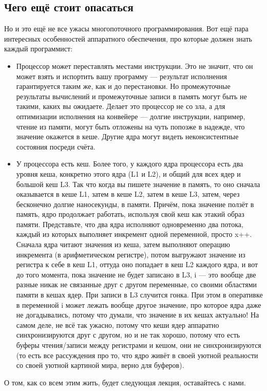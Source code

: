 \documentclass{../../text-style}
\begin{document}
\subsection{Чего ещё стоит опасаться}

Но и это ещё не все ужасы многопоточного программирования. Вот ещё пара интересных особенностей аппаратного обеспечения, про которые должен знать каждый программист:

\begin{itemize}
    \item Процессор может переставлять местами инструкции. Это не значит, что он может взять и испортить вашу программу --- результат исполнения гарантируется таким же, как и до перестановки. Но промежуточные результаты вычислений и промежуточные записи в память могут быть не такими, каких вы ожидаете. Делает это процессор не со зла, а для оптимизации исполнения на конвейере --- долгие инструкции, например, чтение из памяти, могут быть отложены на чуть попозже в надежде, что значение окажется в кеше. Другие ядра могут видеть неконсистентные состояния посреди счёта.
    \item У процессора есть кеш. Более того, у каждого ядра процессора есть два уровня кеша, конкретно этого ядра (L1 и L2), и общий для всех ядер и большой кеш L3. Так что когда вы пишете значение в память, то оно сначала оказывается в кеше L1, затем в кеше L2, затем в кеше L3, затем, через бесконечно долгие наносекунды, в памяти. Причём, пока значение ползёт в память, ядро продолжает работать, используя свой кеш как этакий образ памяти. Представьте, что два ядра исполняют одновременно два потока, каждый из которых выполняет инкремент одной переменной, просто x++. Сначала ядра читают значения из кеша, затем выполняют операцию инкремента (в арифметическом регистре), потом выгружают значение из регистра к себе в кеш L1, оттуда оно попадает в кеш L2 каждого ядра, и вот до того момента, пока значение не будет записано в L3, i --- это вообще две разные никак не связанные друг с другом переменные, со своими областями памяти в кешах ядер. При записи в L3 случится гонка. При этом в оперативке в переменной i может лежать вообще другое значение, про которое ядра даже не догадывались, потому что думали, что значение в их кешах актуально! На самом деле, не всё так ужасно, потому что кеши ядер аппаратно синхронизируются друг с другом, но и не так хорошо, потому что есть буферы чтения/записи между регистрами и кешом, они не синхронизируются (то есть все рассуждения про то, что ядро живёт в своей уютной реальности со своей уютной картиной мира, верно для буферов).
\end{itemize}

О том, как со всем этим жить, будет следующая лекция, оставайтесь с нами.
\end{document}
